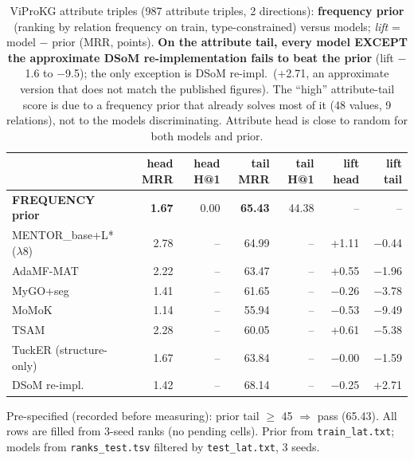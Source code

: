 \begin{table}[t]
\centering
\footnotesize
\setlength{\tabcolsep}{5pt}
\caption{ViProKG attribute triples (987 attribute triples, 2 directions): \textbf{frequency prior} (ranking by relation frequency on train, type-constrained) versus models; \emph{lift} = model $-$ prior (MRR, points). \textbf{On the attribute tail, every model EXCEPT the approximate DSoM re-implementation fails to beat the prior} (lift $-$1.6 to $-$9.5); the only exception is DSoM re-impl.\ (+2.71, an approximate version that does not match the published figures). The ``high'' attribute-tail score is due to a frequency prior that already solves most of it (48 values, 9 relations), not to the models discriminating. Attribute head is close to random for both models and prior.}
\label{tab:lat_prior}
\begin{tabular}{l r r r r r r}
\toprule
 & head MRR & head H@1 & tail MRR & tail H@1 & lift head & lift tail \\
\midrule
\textbf{FREQUENCY prior} & \textbf{1.67} & 0.00 & \textbf{65.43} & 44.38 & -- & -- \\
\midrule
MENTOR\_base+L* ($\lambda$8) & 2.78 & -- & 64.99 & -- & +1.11 & $-$0.44 \\
AdaMF-MAT                  & 2.22 & -- & 63.47 & -- & +0.55 & $-$1.96 \\
MyGO+seg                   & 1.41 & -- & 61.65 & -- & $-$0.26 & $-$3.78 \\
MoMoK                      & 1.14 & -- & 55.94 & -- & $-$0.53 & $-$9.49 \\
TSAM                       & 2.28 & -- & 60.05 & -- & +0.61 & $-$5.38 \\
TuckER (structure-only)          & 1.67 & -- & 63.84 & -- & $-$0.00 & $-$1.59 \\
DSoM re-impl.              & 1.42 & -- & 68.14 & -- & $-$0.25 & +2.71 \\
\bottomrule
\end{tabular}

\vspace{2pt}
\begin{minipage}{\linewidth}\footnotesize\raggedright
Pre-specified (recorded before measuring): prior tail $\geq$ 45 $\Rightarrow$ pass (65.43).
All rows are filled from 3-seed ranks (no pending cells). Prior from
\texttt{train\_lat.txt}; models from \texttt{ranks\_test.tsv} filtered by \texttt{test\_lat.txt}, 3 seeds.
\end{minipage}
\end{table}

